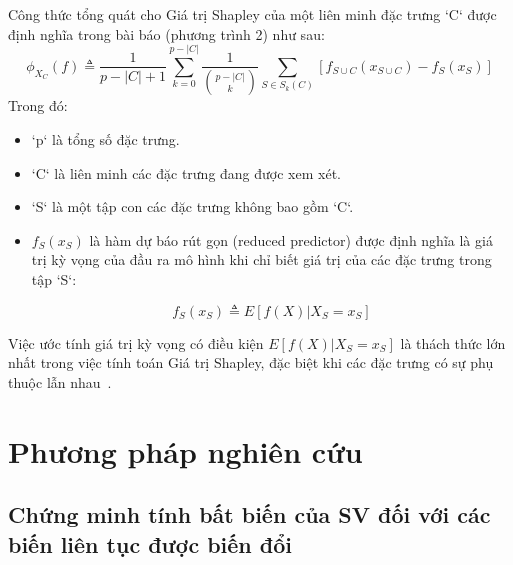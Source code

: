 \documentclass[12pt, a4paper]{article}
\theoremstyle{plain}
\theoremstyle{proposition}
\theoremstyle{lemma}
\begin{document}
Công thức tổng quát cho Giá trị Shapley của một liên minh đặc trưng `C` được định nghĩa trong bài báo (phương trình 2) như sau:
$$
\phi_{X_C}(f) \triangleq \frac{1}{p - |C| + 1} \sum_{k=0}^{p-|C|} \frac{1}{\binom{p-|C|}{k}} \sum_{S \in S_k(C)} [f_{S \cup C}(x_{S \cup C}) - f_S(x_S)] \label{eq:classic_shapley_game}
$$
Trong đó:
\begin{itemize}
    \item `p` là tổng số đặc trưng.
    \item `C` là liên minh các đặc trưng đang được xem xét.
    \item `S` là một tập con các đặc trưng không bao gồm `C`.

    \item $f_S(x_S)$ là hàm dự báo rút gọn (reduced predictor) được định nghĩa là giá trị kỳ vọng của đầu ra mô hình khi chỉ biết giá trị của các đặc trưng trong tập `S`:
    
    $$
    f_S(x_S) \triangleq E[f(X) | X_S = x_S]
    $$

\end{itemize}
Việc ước tính giá trị kỳ vọng có điều kiện $E[f(X) | X_S = x_S]$ là thách thức lớn nhất trong việc tính toán Giá trị Shapley, đặc biệt khi các đặc trưng có sự phụ thuộc lẫn nhau~\citep{aas2020explaining}.


\section{Phương pháp nghiên cứu}
\subsection{Chứng minh tính bất biến của SV đối với các biến liên tục được biến đổi}
\end{document}
